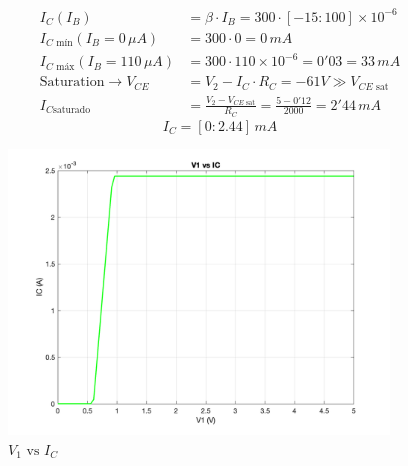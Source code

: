 \documentclass[a4paper]{article}
\begin{document}
\newpage

\begin{align}
I_{C}(I_{B})&=\beta \cdot I_{B} = 300\cdot [-15:100]\times 10^{-6} \\
I_{C\text{ mín}}(I_{B}=0\,\mu A) & =300\cdot 0=0\,mA \\
I_{C\text{ máx}}(I_{B}=110\,\mu A) & = 300\cdot 110\times 10^{-6}=0'03 = 33\,mA \\
\text{Saturation}\rightarrow V_{CE} &= V_2-I_C\cdot R_C =-61V \gg V_{CE\text{ sat}} \\
I_{C\text{saturado}} &= \frac{V_2-V_{CE\text{ sat}}}{R_C}=\frac{5-0'12}{2000}=2'44\,mA
\end{align}
$$
\boxed{I_{C}=[0:2.44]\,mA}
$$
\begin{figure}[H]
    \centering
    \includegraphics[width=0.9\textwidth]{IMG/bjt_3.png}
    \caption{$V_1\text{ vs }I_C$}
    \label{fig:bjt_3}
\end{figure}

\newpage
\end{document}
